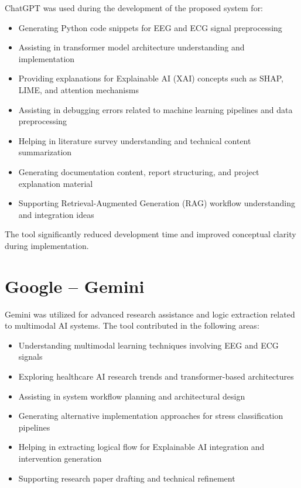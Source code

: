 \documentclass[12pt,a4paper]{report}
\begin{document}
ChatGPT was used during the development of the proposed system for:

\begin{itemize}
    \item Generating Python code snippets for EEG and ECG signal preprocessing
    \item Assisting in transformer model architecture understanding and implementation
    \item Providing explanations for Explainable AI (XAI) concepts such as SHAP, LIME, and attention mechanisms
    \item Assisting in debugging errors related to machine learning pipelines and data preprocessing
    \item Helping in literature survey understanding and technical content summarization
    \item Generating documentation content, report structuring, and project explanation material
    \item Supporting Retrieval-Augmented Generation (RAG) workflow understanding and integration ideas
\end{itemize}

The tool significantly reduced development time and improved conceptual clarity during implementation.

\section{Google -- Gemini}

Gemini was utilized for advanced research assistance and logic extraction related to multimodal AI systems. The tool contributed in the following areas:

\begin{itemize}
    \item Understanding multimodal learning techniques involving EEG and ECG signals
    \item Exploring healthcare AI research trends and transformer-based architectures
    \item Assisting in system workflow planning and architectural design
    \item Generating alternative implementation approaches for stress classification pipelines
    \item Helping in extracting logical flow for Explainable AI integration and intervention generation
    \item Supporting research paper drafting and technical refinement
\end{itemize}
\end{document}

